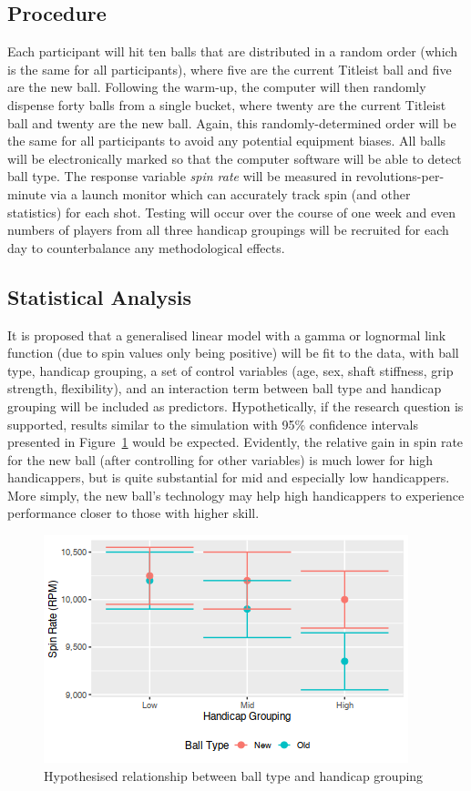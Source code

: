 \documentclass{article}
\begin{document}
\subsection*{Procedure}

Each participant will hit ten balls that are distributed in a random order (which is the same for all participants), where five are the current Titleist ball and five are the new ball. 
Following the warm-up, the computer will then randomly dispense forty balls from a single bucket, where twenty are the current Titleist ball and twenty are the new ball. 
Again, this randomly-determined order will be the same for all participants to avoid any potential equipment biases.
All balls will be electronically marked so that the computer software will be able to detect ball type. 
The response variable \textit{spin rate} will be measured in revolutions-per-minute via a launch monitor which can accurately track spin (and other statistics) for each shot. 
Testing will occur over the course of one week and even numbers of players from all three handicap groupings will be recruited for each day to counterbalance any methodological effects.

\subsection*{Statistical Analysis}

It is proposed that a generalised linear model with a gamma or lognormal link function (due to spin values only being positive) will be fit to the data, with ball type, handicap grouping, a set of control variables (age, sex, shaft stiffness, grip strength, flexibility), and an interaction term between ball type and handicap grouping will be included as predictors. 
Hypothetically, if the research question is supported, results similar to the simulation with 95\% confidence intervals presented in Figure~\ref{fig:expectations} would be expected.
Evidently, the relative gain in spin rate for the new ball (after controlling for other variables) is much lower for high handicappers, but is quite substantial for mid and especially low handicappers. 
More simply, the new ball's technology may help high handicappers to experience performance closer to those with higher skill.

\begin{figure}[h]
    \centering
    \includegraphics[max width=\linewidth, scale=0.53]{expectations}
    \caption{\label{fig:expectations}Hypothesised relationship between ball type and handicap grouping}
\end{figure}
\end{document}

